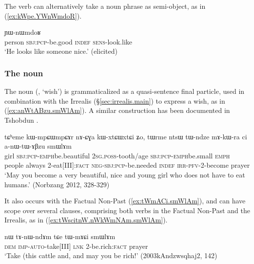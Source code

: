 The verb  can alternatively take a noun phrase as semi-object, as in (\ref{ex:kWpe.YWnWmdoR}).

\begin{exe}
	\ex \label{ex:kWpe.YWnWmdoR}
	\gll [tɯrme kɯ-pe ci] ɲɯ-nɯmdoʁ \\
	person \textsc{sbj}:\textsc{pcp}-be.good \textsc{indef} \textsc{sens}-look.like \\
	\glt `He looks like someone nice.' (elicited)
\end{exe}  



\subsubsection{The noun  } \label{sec:smWlAm.TAME}
The noun  (, `wish') is grammaticalized as a quasi-sentence final particle, used in combination with the Irrealis (§\ref{sec:irrealis.main}) to express a wish, as in (\ref{ex:anWtABzu.smWlAm}). A similar construction has been documented in Tshobdun \citep{jackson07irrealis}.

\begin{exe}
	\ex \label{ex:anWtABzu.smWlAm}
	\gll tɕʰeme kɯ-mpɕɯ\redp{}mpɕɤr nɤ-ɕɣa kɯ-xtɕɯ\redp{}xtɕi ʑo, tɯrme ntsɯ tɯ-ndze mɤ-kɯ-ra ci a-nɯ-tɯ-ɤβzu smɯlɤm \\
	girl \textsc{sbj}:\textsc{pcp}-\textsc{emph}\redp{}be.beautiful   \textsc{2sg}.\textsc{poss}-tooth/age  \textsc{sbj}:\textsc{pcp}-\textsc{emph}\redp{}be.small \textsc{emph}  people always 2-eat[III]:\textsc{fact} \textsc{neg}-\textsc{sbj}:\textsc{pcp}-be.needed \textsc{indef} \textsc{irr}-\textsc{pfv}-2-become prayer \\
	\glt `May you become a very beautiful, nice and young girl who does not have to eat humans.' (Norbzang 2012, 328-329)
\end{exe}

It also occurs with the Factual Non-Past (\ref{ex:tWmACi.smWlAm}), and can have scope over several clauses, comprising both verbs in the Factual Non-Past and the Irrealis, as in (\ref{ex:tWscitnW.nWkWmNAm.smWlAm}).

\begin{exe}
	\ex \label{ex:tWmACi.smWlAm}
	\gll  nɯ tɤ-nɯ-ndɤm tɕe tɯ-mɤɕi smɯlɤm  \\
	\textsc{dem} \textsc{imp}-\textsc{auto}-take[III] \textsc{lnk} 2-be.rich:\textsc{fact} prayer \\
	\glt `Take (this cattle and, and may you be rich!' (2003kAndzwsqhaj2, 142)
\end{exe}

